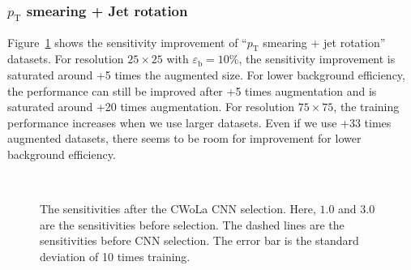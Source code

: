 \documentclass[12pt]{article}
\begin{document}
        \subsubsection{\texorpdfstring{$p_{\mathrm{T}}$}{pT} smearing + Jet rotation}%
        \label{subs:pt_smearing_jet_rotation}
            Figure~\ref{fig:sensitivity_improvement_origin_pt_jet_aug_SB_1_3} shows the sensitivity improvement of ``$p_{\text{T}}$ smearing + jet rotation'' datasets. For resolution $25\times 25$ with $\varepsilon_{\text{b}} = 10 \%$, the sensitivity improvement is saturated around +5 times the augmented size. For lower background efficiency, the performance can still be improved after +5 times augmentation and is saturated around +20 times augmentation. For resolution $75\times 75$, the training performance increases when we use larger datasets. Even if we use +33 times augmented datasets, there seems to be room for improvement for lower background efficiency.
            \begin{figure}[htpb]
                \centering
                 \\
                \caption{The sensitivities after the CWoLa CNN selection. Here, $1.0$ and $3.0$ are the sensitivities before selection. The dashed lines are the sensitivities before CNN selection. The error bar is the standard deviation of 10 times training.}
                \label{fig:sensitivity_improvement_origin_pt_jet_aug_SB_1_3}
            \end{figure}
\end{document}
